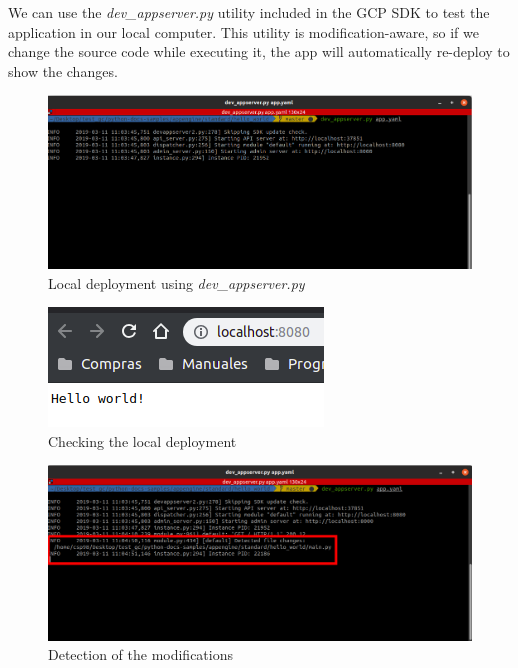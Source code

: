 \documentclass[12pt,english]{article}
\begin{document}
We can use the \emph{dev\_appserver.py} utility included in the GCP SDK to test the application in our local computer. This utility is modification-aware, so if we change the source code while executing it, the app will automatically re-deploy to show the changes.\\

\begin{figure}[H]
  \centering
  \includegraphics[scale = 0.5]{../img/tutorial/4localdeploy}
  \caption{Local deployment using \emph{dev\_appserver.py}}
\end{figure}

\begin{figure}[H]
  \centering
  \includegraphics[scale = 1]{../img/tutorial/5localbrowse}
  \caption{Checking the local deployment}
\end{figure}

\begin{figure}[H]
  \centering
  \includegraphics[scale = 0.38]{../img/tutorial/6modify}
  \caption{Detection of the modifications}
\end{figure}
\end{document}
